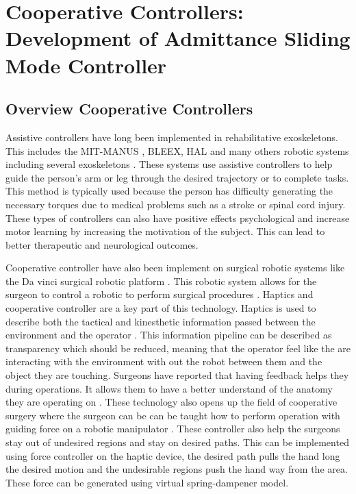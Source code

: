 \section{Cooperative Controllers: Development of Admittance Sliding Mode Controller}


\subsection{Overview Cooperative Controllers}
Assistive controllers have long been implemented in rehabilitative exoskeletons. This includes the MIT-MANUS \cite{ju2005rehabilitation}, BLEEX\cite{kazerooni2006hybrid}, HAL\cite{kawamoto2004power} and many others robotic systems including several exoskeletons \cite{kim2012admittance,ott2010unified,huo2011control}. These systems use assistive controllers to help guide the person's arm or leg through the desired trajectory or to complete tasks. This method is typically used because the person has difficulty generating the necessary torques due to medical problems such as a stroke or spinal cord injury. These types of controllers can also have positive effects  psychological and increase motor learning by increasing the motivation of the subject. This can lead to better   therapeutic and neurological outcomes.

Cooperative controller have also been implement on surgical robotic systems like the Da vinci surgical robotic platform \cite{d2021accelerating}. This robotic system allows for the surgeon to control a robotic to perform surgical procedures \cite{el2020review,amirabdollahian2018prevalence,okamura2009haptic}. Haptics and cooperative controller are a key part of this technology. Haptics is used to describe both the tactical and kinesthetic information passed between the environment and the operator \cite{okamura2004methods}. This information pipeline can be described as transparency which should be reduced, meaning that the operator feel like the are interacting with the environment with out the robot between them and the object they are touching. Surgeons have reported that having feedback helps they during operations. It allows them to have a better understand of the anatomy they are operating on \cite{koehn2015surgeons}. 
These technology also opens up the field of cooperative surgery where the surgeon can be can be taught how to perform operation with guiding force on a robotic manipulator \cite{varier2020collaborative}. These controller also help the surgeons stay out of undesired regions and stay on desired paths. This can be implemented using force controller on the haptic device, the desired path pulls the hand long the desired motion and the undesirable regions push the hand way from the area. These force can be generated using virtual spring-dampener model.


